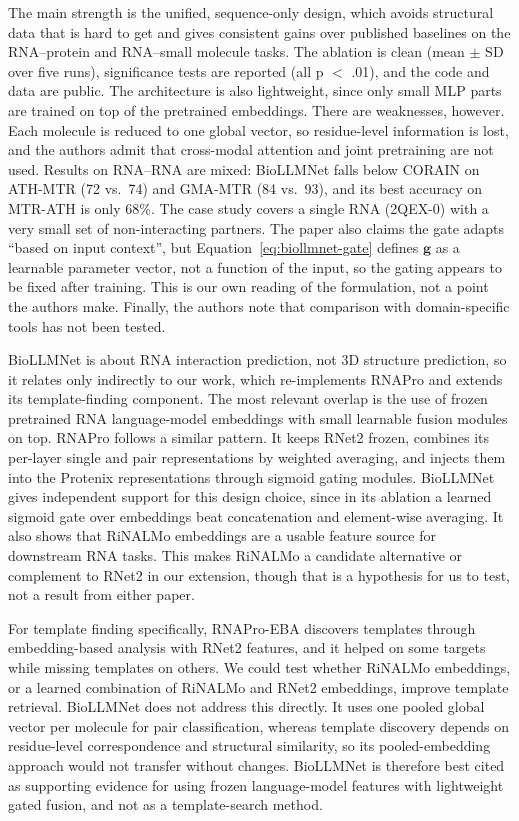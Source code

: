 \documentclass{FastFyp}
\begin{document}
The main strength is the unified, sequence-only design, which avoids structural data that is hard to get and gives consistent gains over published baselines on the RNA--protein and RNA--small molecule tasks. The ablation is clean (mean $\pm$ SD over five runs), significance tests are reported (all p $<$ .01), and the code and data are public. The architecture is also lightweight, since only small MLP parts are trained on top of the pretrained embeddings. There are weaknesses, however. Each molecule is reduced to one global vector, so residue-level information is lost, and the authors admit that cross-modal attention and joint pretraining are not used. Results on RNA--RNA are mixed: BioLLMNet falls below CORAIN on ATH-MTR (72 vs.\ 74) and GMA-MTR (84 vs.\ 93), and its best accuracy on MTR-ATH is only 68\%. The case study covers a single RNA (2QEX-0) with a very small set of non-interacting partners. The paper also claims the gate adapts ``based on input context'', but Equation~\ref{eq:biollmnet-gate} defines $\mathbf{g}$ as a learnable parameter vector, not a function of the input, so the gating appears to be fixed after training. This is our own reading of the formulation, not a point the authors make. Finally, the authors note that comparison with domain-specific tools has not been tested.

BioLLMNet is about RNA interaction prediction, not 3D structure prediction, so it relates only indirectly to our work, which re-implements RNAPro and extends its template-finding component. The most relevant overlap is the use of frozen pretrained RNA language-model embeddings with small learnable fusion modules on top. RNAPro follows a similar pattern. It keeps RNet2 frozen, combines its per-layer single and pair representations by weighted averaging, and injects them into the Protenix representations through sigmoid gating modules. BioLLMNet gives independent support for this design choice, since in its ablation a learned sigmoid gate over embeddings beat concatenation and element-wise averaging. It also shows that RiNALMo embeddings are a usable feature source for downstream RNA tasks. This makes RiNALMo a candidate alternative or complement to RNet2 in our extension, though that is a hypothesis for us to test, not a result from either paper.

For template finding specifically, RNAPro-EBA discovers templates through embedding-based analysis with RNet2 features, and it helped on some targets while missing templates on others. We could test whether RiNALMo embeddings, or a learned combination of RiNALMo and RNet2 embeddings, improve template retrieval. BioLLMNet does not address this directly. It uses one pooled global vector per molecule for pair classification, whereas template discovery depends on residue-level correspondence and structural similarity, so its pooled-embedding approach would not transfer without changes. BioLLMNet is therefore best cited as supporting evidence for using frozen language-model features with lightweight gated fusion, and not as a template-search method.
\end{document}

